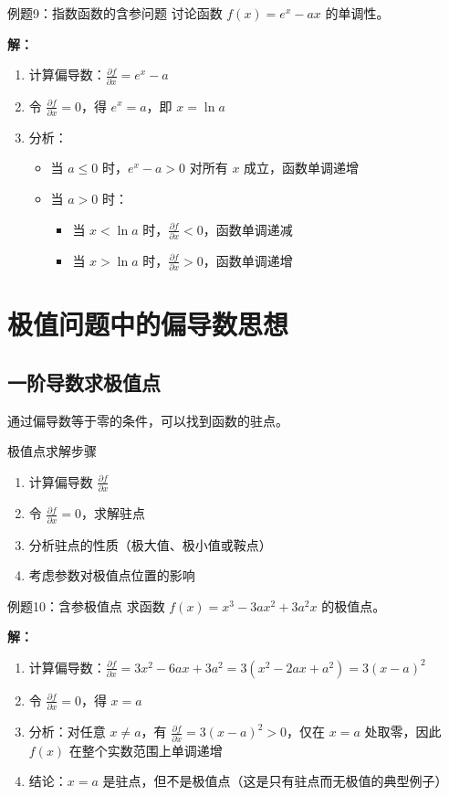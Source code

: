 \documentclass[a4paper,11pt]{ctexart}
\newcommand{\partialder}[2]{\frac{\partial #1}{\partial #2}}
\theoremstyle{definition}
\theoremstyle{remark}
\begin{document}
\begin{examplebox}{例题9：指数函数的含参问题}
讨论函数 $f(x) = e^x - ax$ 的单调性。

\textbf{解：}
\begin{enumerate}
    \item 计算偏导数：$\partialder{f}{x} = e^x - a$
    \item 令 $\partialder{f}{x} = 0$，得 $e^x = a$，即 $x = \ln a$
    \item 分析：
    \begin{itemize}
        \item 当 $a \leq 0$ 时，$e^x - a > 0$ 对所有 $x$ 成立，函数单调递增
        \item 当 $a > 0$ 时：
        \begin{itemize}
            \item 当 $x < \ln a$ 时，$\partialder{f}{x} < 0$，函数单调递减
            \item 当 $x > \ln a$ 时，$\partialder{f}{x} > 0$，函数单调递增
        \end{itemize}
    \end{itemize}
\end{enumerate}
\end{examplebox}

\section{极值问题中的偏导数思想}

\subsection{一阶导数求极值点}

通过偏导数等于零的条件，可以找到函数的驻点。

\begin{methodbox}{极值点求解步骤}
\begin{enumerate}
    \item 计算偏导数 $\partialder{f}{x}$
    \item 令 $\partialder{f}{x} = 0$，求解驻点
    \item 分析驻点的性质（极大值、极小值或鞍点）
    \item 考虑参数对极值点位置的影响
\end{enumerate}
\end{methodbox}

\begin{examplebox}{例题10：含参极值点}
求函数 $f(x) = x^3 - 3ax^2 + 3a^2x$ 的极值点。

\textbf{解：}
\begin{enumerate}
    \item 计算偏导数：$\partialder{f}{x} = 3x^2 - 6ax + 3a^2 = 3(x^2 - 2ax + a^2) = 3(x-a)^2$
    \item 令 $\partialder{f}{x} = 0$，得 $x = a$
    \item 分析：对任意 $x \neq a$，有 $\partialder{f}{x} = 3(x-a)^2 > 0$，仅在 $x = a$ 处取零，因此 $f(x)$ 在整个实数范围上单调递增
    \item 结论：$x = a$ 是驻点，但不是极值点（这是只有驻点而无极值的典型例子）
\end{enumerate}
\end{examplebox}
\end{document}
